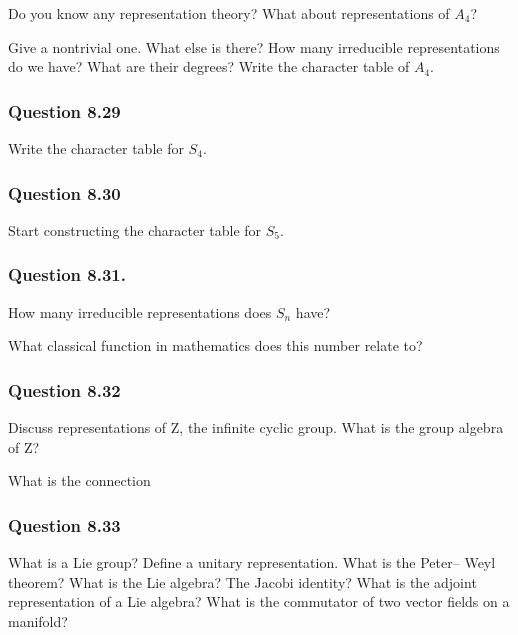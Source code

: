 Do you know any representation theory? What about representations of
\(A_4\)?

Give a nontrivial one. What else is there? How many irreducible
representations do we have? What are their degrees? Write the character
table of \(A_4\).

\hypertarget{question-8.29}{%
\subsubsection{Question 8.29}\label{question-8.29}}

Write the character table for \(S_4\).

\hypertarget{question-8.30}{%
\subsubsection{Question 8.30}\label{question-8.30}}

Start constructing the character table for \(S_5\).

\hypertarget{question-8.31.}{%
\subsubsection{Question 8.31.}\label{question-8.31.}}

How many irreducible representations does \(S_n\) have?

What classical function in mathematics does this number relate to?

\hypertarget{question-8.32}{%
\subsubsection{Question 8.32}\label{question-8.32}}

Discuss representations of Z, the infinite cyclic group. What is the
group algebra of Z?

What is the connection 

\hypertarget{question-8.33}{%
\subsubsection{Question 8.33}\label{question-8.33}}

What is a Lie group? Define a unitary representation. What is the
Peter-- Weyl theorem? What is the Lie algebra? The Jacobi identity? What
is the adjoint representation of a Lie algebra? What is the commutator
of two vector fields on a manifold?

